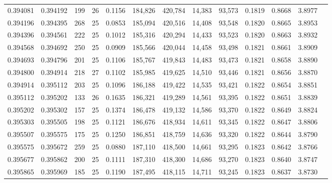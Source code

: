 \begin{tabular}{rrrrrrrrrrrrr}
0.394081 & 0.394192 & 199 &  26 &                                     0.1156 & 184,826 & 420,784 &  14,383 &  93,573 & 0.1819 & 0.8668 & 3.8977 \\
0.394196 & 0.394395 & 268 &  25 &                                     0.0853 & 185,094 & 420,516 &  14,408 &  93,548 & 0.1820 & 0.8665 & 3.8953 \\
0.394396 & 0.394561 & 222 &  25 &                                     0.1012 & 185,316 & 420,294 &  14,433 &  93,523 & 0.1820 & 0.8663 & 3.8932 \\
0.394568 & 0.394692 & 250 &  25 &                                     0.0909 & 185,566 & 420,044 &  14,458 &  93,498 & 0.1821 & 0.8661 & 3.8909 \\
0.394693 & 0.394796 & 201 &  25 &                                     0.1106 & 185,767 & 419,843 &  14,483 &  93,473 & 0.1821 & 0.8658 & 3.8890 \\
0.394800 & 0.394914 & 218 &  27 &                                     0.1102 & 185,985 & 419,625 &  14,510 &  93,446 & 0.1821 & 0.8656 & 3.8870 \\
0.394914 & 0.395112 & 203 &  25 &                                     0.1096 & 186,188 & 419,422 &  14,535 &  93,421 & 0.1822 & 0.8654 & 3.8851 \\
0.395112 & 0.395202 & 133 &  26 &                                     0.1635 & 186,321 & 419,289 &  14,561 &  93,395 & 0.1822 & 0.8651 & 3.8839 \\
0.395202 & 0.395302 & 157 &  25 &                                     0.1374 & 186,478 & 419,132 &  14,586 &  93,370 & 0.1822 & 0.8649 & 3.8824 \\
0.395303 & 0.395505 & 198 &  25 &                                     0.1121 & 186,676 & 418,934 &  14,611 &  93,345 & 0.1822 & 0.8647 & 3.8806 \\
0.395507 & 0.395575 & 175 &  25 &                                     0.1250 & 186,851 & 418,759 &  14,636 &  93,320 & 0.1822 & 0.8644 & 3.8790 \\
0.395575 & 0.395672 & 259 &  25 &                                     0.0880 & 187,110 & 418,500 &  14,661 &  93,295 & 0.1823 & 0.8642 & 3.8766 \\
0.395677 & 0.395862 & 200 &  25 &                                     0.1111 & 187,310 & 418,300 &  14,686 &  93,270 & 0.1823 & 0.8640 & 3.8747 \\
0.395865 & 0.395969 & 185 &  25 &                                     0.1190 & 187,495 & 418,115 &  14,711 &  93,245 & 0.1823 & 0.8637 & 3.8730 \\

\end{tabular}
